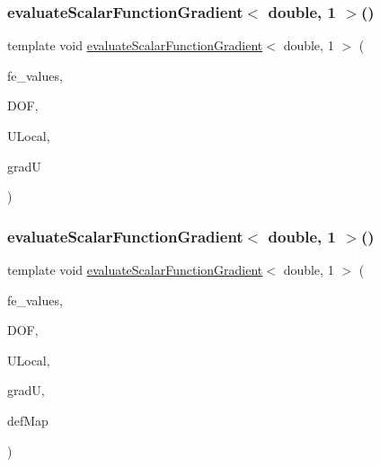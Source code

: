 \mbox{\label{function_evaluations_8cc_a778e8b0e56686ca05b7ae735ede7547d}} 
\subsubsection{\texorpdfstring{evaluate\+Scalar\+Function\+Gradient$<$ double, 1 $>$()}{evaluateScalarFunctionGradient< double, 1 >()}\hspace{0.1cm}{\footnotesize\ttfamily [1/4]}}
{\footnotesize\ttfamily template void \mbox{\hyperlink{group___evaluation_functions_gabedd4ae2841d2332ed0df0513b189e34}{evaluate\+Scalar\+Function\+Gradient}}$<$ double, 1 $>$ (\begin{DoxyParamCaption}\item[{const F\+E\+Values$<$ 1 $>$ \&}]{fe\+\_\+values,  }\item[{unsigned int}]{D\+OF,  }\item[{Table$<$ 1, double $>$ \&}]{U\+Local,  }\item[{Table$<$ 2, double $>$ \&}]{gradU }\end{DoxyParamCaption})}

\mbox{\label{function_evaluations_8cc_a3cc57fd0ac6ea503b820934671353e6f}} 
\subsubsection{\texorpdfstring{evaluate\+Scalar\+Function\+Gradient$<$ double, 1 $>$()}{evaluateScalarFunctionGradient< double, 1 >()}\hspace{0.1cm}{\footnotesize\ttfamily [2/4]}}
{\footnotesize\ttfamily template void \mbox{\hyperlink{group___evaluation_functions_gabedd4ae2841d2332ed0df0513b189e34}{evaluate\+Scalar\+Function\+Gradient}}$<$ double, 1 $>$ (\begin{DoxyParamCaption}\item[{const F\+E\+Values$<$ 1 $>$ \&}]{fe\+\_\+values,  }\item[{unsigned int}]{D\+OF,  }\item[{Table$<$ 1, double $>$ \&}]{U\+Local,  }\item[{Table$<$ 2, double $>$ \&}]{gradU,  }\item[{\mbox{\hyperlink{structdeformation_map}{deformation\+Map}}$<$ double, 1 $>$ \&}]{def\+Map }\end{DoxyParamCaption})}

